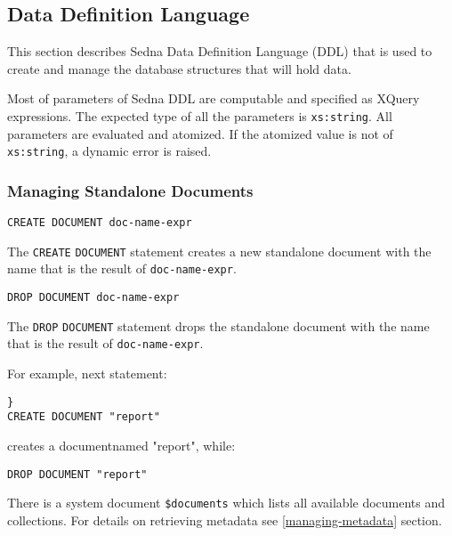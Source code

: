 \documentclass[a4paper,12pt]{article}
\begin{document}
\subsection{Data Definition Language}

This section describes Sedna Data Definition Language (DDL) that is used to
create and manage the database structures that will hold data.

Most of parameters of Sedna DDL are computable and specified as XQuery
expressions. The expected type of all the parameters is \verb!xs:string!. All
parameters are evaluated and atomized. If the atomized value is not of
\verb!xs:string!, a dynamic error is raised.


\subsubsection{Managing Standalone Documents}
\begin{verbatim}
CREATE DOCUMENT doc-name-expr
\end{verbatim}

The \verb!CREATE! \verb!DOCUMENT! statement creates a new standalone document
with the name that is the result of \verb!doc-name-expr!.

\begin{verbatim}
DROP DOCUMENT doc-name-expr
\end{verbatim}

The \verb!DROP! \verb!DOCUMENT! statement drops the standalone document with the
name that is the result of \verb!doc-name-expr!.

For example, next statement:
\begin{verbatim}}
CREATE DOCUMENT "report"
\end{verbatim}
creates a documentnamed "report", while:
\begin{verbatim}
DROP DOCUMENT "report"
\end{verbatim}

There is a system document \verb!$documents! which lists all available documents
and collections. For details on retrieving metadata see \ref{managing-metadata}
section.


\end{document}
